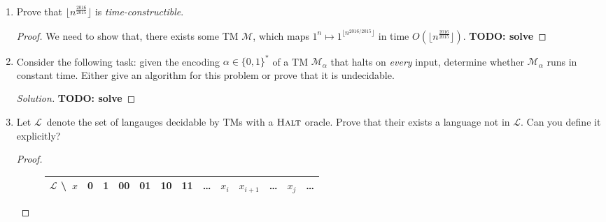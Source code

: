 \documentclass[usletter]{article}
\newcommand {\langset}[1]      {\ensuremath{\mathcal{#1}}}
\newcommand {\machine}[1]      {\ensuremath{\mathscr{#1}}}
\newcommand {\langfunc}        {\ensuremath{\mathfrak{L}}}
\newcommand {\namedlangset}[1] {\ensuremath{\textnormal{\textsc{#1}}}}
\newcommand {\family}[1]       {\ensuremath{\textnormal{\textsf{#1}}}}
\newcommand {\term}[1]      {\textit{#1}}
\newcommand{\todo}[1]{{\large \textbf{TODO: #1}}}
\newcommand {\langL}          {\langset{L}}
\newcommand {\machineM}       {\machine{M}}
\newcommand {\allstrings}     {\ensuremath{\{0,1\}^*}}
\begin{document}
\begin{enumerate}
\begin{proof}
    Thus, we have proved that
    $\langfunc(\machineM') =
     \langL_1 \cup (\langL_2 \cap \langL_3) \in \family{NP}$.
  \end{proof}

  \begin{remark}
    In fact, we can always treat unions as disjunctions and intersections as
    conjunctions over machine outputs;
    to prove that \family{NP} is closed under these operations.
  \end{remark}

  \item Prove that $\lfloor n^{\frac{2016}{2015}} \rfloor$
        is \term{time-constructible}.
  \begin{proof}
    We need to show that, there exists some TM \machineM,
    which maps $1^n \mapsto 1^{\lfloor n^{2016/2015} \rfloor}$
    in time $O(\lfloor n^{\frac{2016}{2015}} \rfloor)$.
    \todo{solve}
  \end{proof}

  \item Consider the following task: given the encoding $\alpha \in \allstrings$
        of a TM $\machineM_\alpha$ that halts on \textit{every} input,
        determine whether $\machineM_\alpha$ runs in constant time.
        Either give an algorithm for this problem
        or prove that it is undecidable.
  \begin{proof}[Solution]
    \todo{solve}
  \end{proof}

  \item Let \langL\ denote the set of langauges decidable by TMs with a
        \namedlangset{Halt} oracle.
        Prove that their exists a language not in \langL.
        Can you define it explicitly?
  \begin{proof}
    \begin{figure}[h]
    \centering
    \def\arraystretch{1.8}\tabcolsep=6pt
    \begin{tabular}{|c||c|c|c|c|c|c|c|c|c|c|c|c|}
      \hline
      \textbf{\langL} \textbackslash~$x$
        & 0 & 1 & 00 & 01 & 10 & 11 & \ldots & $x_i$ & $x_{i+1}$ & \ldots
        & $x_j$ & \ldots \\\hline\hline


\end{tabular}
\end{figure}
\end{proof}
\end{enumerate}
\end{document}
